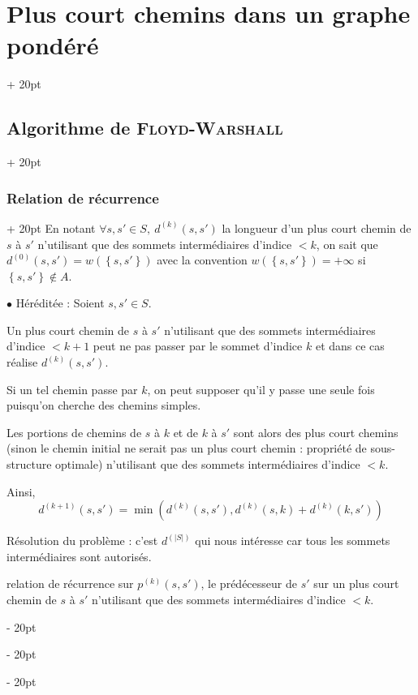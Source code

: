 \documentclass[a4paper, 12pt, twoside]{article}
\newcommand{\lr}[1]{\left( #1 \right)}
\newcommand{\set}[1]{\left\{ #1 \right\}}
\newcommand{\abs}[1]{\left\lvert #1 \right\rvert}
\newcommand{\ind}[1][20pt]{\advance\leftskip + #1}
\newcommand{\deind}[1][20pt]{\advance\leftskip - #1}
\newenvironment{indt}[2][20pt]{#2 \par \ind[#1]}{\par \deind} %
\begin{document}
\begin{indt}{\section{Plus court chemins dans un graphe pondéré}}
\begin{indt}{\subsection{Algorithme de \textsc{Floyd-Warshall}}}
\begin{indt}{\subsubsection{Relation de récurrence}}
                En notant $\forall s, s' \in S,\ d^{(k)}(s, s')$ la longueur d'un plus court chemin de $s$ à $s'$ n'utilisant que des sommets intermédiaires d'indice $< k$, on sait que $d^{(0)}(s, s') = w(\set{s, s'})$ avec la convention $w(\set{s, s'}) = +\infty$ si $\set{s, s'} \notin A$.

                \vspace{6pt}
                
                $\bullet$ Héréditée : Soient $s, s' \in S$.

                Un plus court chemin de $s$ à $s'$ n'utilisant que des sommets intermédiaires d'indice $< k + 1$ peut ne pas passer par le sommet d'indice $k$ et dans ce cas réalise $d^{(k)}(s, s')$.

                Si un tel chemin passe par $k$, on peut supposer qu'il y passe une seule fois puisqu'on cherche des chemins simples.

                Les portions de chemins de $s$ à $k$ et de $k$ à $s'$ sont alors des plus court chemins (sinon le chemin initial ne serait pas un plus court chemin : propriété de sous-structure optimale) n'utilisant que des sommets intermédiaires d'indice $< k$.

                Ainsi,
                \[
                    d^{(k + 1)}(s, s') = \min\!\lr{d^{(k)}(s, s'), d^{(k)}(s, k) + d^{(k)}(k, s')}
                \]

                Résolution du problème : c'est $d^{(\abs S)}$ qui nous intéresse car tous les sommets intermédiaires sont autorisés.

                 relation de récurrence sur $p^{(k)}(s, s')$, le prédécesseur de $s'$ sur un plus court chemin de $s$ à $s'$ n'utilisant que des sommets intermédiaires d'indice $< k$.
            \end{indt}
        \end{indt}
    \end{indt}
    
    
    
\end{document}

